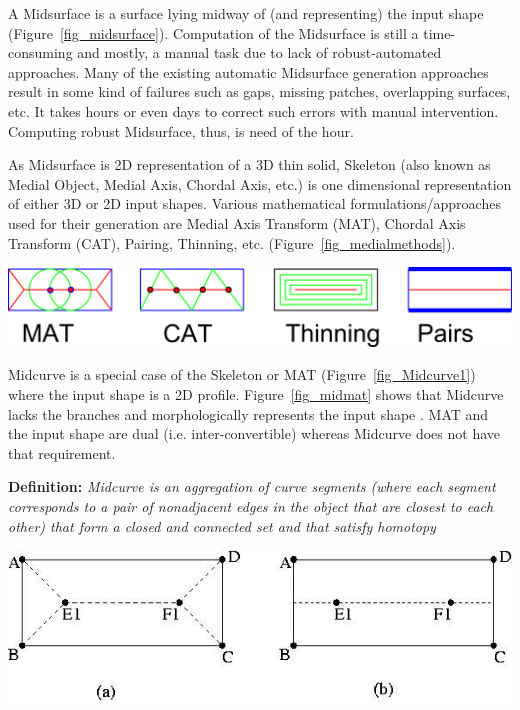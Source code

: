 \documentclass[9pt,academicons]{article}
\begin{document}
A Midsurface is a surface lying midway of (and representing) the input shape (Figure~\ref{fig_midsurface}). Computation of the Midsurface is still a time-consuming and mostly, a manual task due to lack of robust-automated approaches. Many of the existing automatic Midsurface generation approaches result in some kind of failures such as gaps, missing patches, overlapping surfaces, etc. It takes hours or even days to correct such errors with manual intervention. Computing robust Midsurface, thus, is need of the hour.


	
	
As Midsurface is 2D representation of a 3D thin solid, Skeleton (also known as Medial Object, Medial Axis, Chordal Axis, etc.) is one dimensional representation of either 3D or 2D input shapes. Various mathematical formulations/approaches used for their generation are Medial Axis Transform (MAT), Chordal Axis Transform (CAT), Pairing, Thinning, etc. (Figure~\ref{fig_medialmethods}). 

    \begin{center}
	\includegraphics[width=0.6\linewidth]{images/MedialMethodsOnlyShort}
	\label{fig_medialmethods}
    \end{center}
		
Midcurve is a special case of the Skeleton or MAT (Figure~\ref{fig_Midcurve1}) where the input shape is a 2D profile. Figure~\ref{fig_midmat} shows that Midcurve lacks the branches and morphologically represents the input shape \cite{Ramanathan04}. MAT and the input shape are dual (i.e. inter-convertible) whereas Midcurve does not have that requirement.

{\bf Definition:} \textit{Midcurve is an aggregation of curve segments (where each segment corresponds to a pair of nonadjacent edges in the object that are closest to each other) that form a closed and connected set and that satisfy homotopy}


    \begin{center}
	\includegraphics[width=0.5\linewidth]{images/Medial-Axis-and-Mid-curve_W640}
	\label{fig_midmat}
    \end{center}
		
\end{document}
